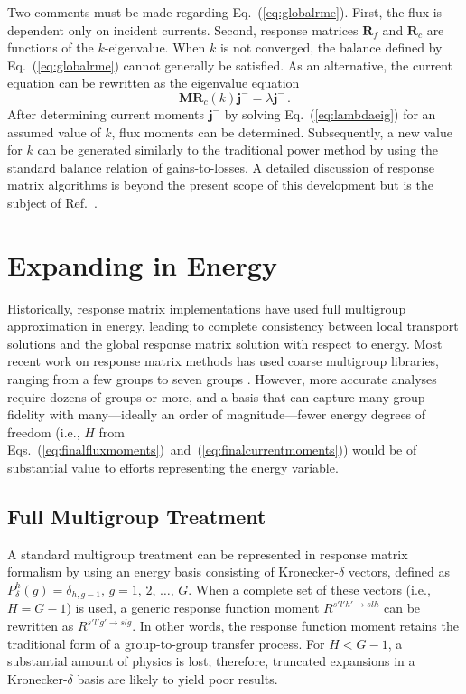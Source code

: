 \documentclass[5p,times,twocolumn,10pt]{elsarticle}
\newcommand{\EQ}[1]{Eq.~(\ref{#1})}               %
\newcommand{\EQSTWO}[2]{Eqs.~(\ref{#1})~and~(\ref{#2})}            %
\begin{document}
  Two comments must be made regarding 
  \EQ{eq:globalrme}.  First, the flux is dependent only 
  on incident currents. Second, response 
  matrices $\mathbf{R}_{f}$ and $\mathbf{R}_{c}$ are 
  functions of the $k$-eigenvalue.  When $k$ is not converged,
  the balance defined by \EQ{eq:globalrme} cannot generally be satisfied.
  As an alternative,
  the current equation can be rewritten as the 
  eigenvalue equation
  \begin{equation}
    \mathbf{MR}_{c}(k)   \mathbf{j}^- = \lambda \mathbf{j}^- \, .
    \label{eq:lambdaeig}
  \end{equation}
  After determining current moments $\mathbf{j}^-$ 
  by solving \EQ{eq:lambdaeig} for an assumed value of $k$, 
  flux moments can be determined.  
  Subsequently, a new value 
  for $k$ can be generated similarly to the traditional 
  power method by using the standard 
  balance relation of gains-to-losses.
  A detailed discussion of 
  response matrix algorithms is beyond the present scope of this development but 
  is the subject of Ref.~. 
  
  \section{Expanding in Energy}
  
  Historically, response matrix implementations have used full multigroup
  approximation in energy, leading to complete consistency between local transport solutions and the global
  response matrix solution with respect to energy. Most recent work on response matrix methods has used 
  coarse multigroup libraries, ranging from a few groups \cite{ishii2009tdd} to seven groups \cite{forget2006tdh}.
  However, more accurate analyses require dozens of groups or more, and a basis that can capture many-group fidelity
  with many---ideally an order of magnitude---fewer energy degrees of freedom (i.e., $H$ from
  \EQSTWO{eq:finalfluxmoments}{eq:finalcurrentmoments}) would be of substantial value to efforts representing
  the energy variable.  
  
  \subsection{Full Multigroup Treatment}
  
  A standard multigroup treatment can be represented in
  response matrix formalism by using an energy basis consisting 
  of Kronecker-$\delta$ vectors, defined as
  $P_{\delta}^h(g) = \delta_{h, g-1},\, g=1,\, 2,\, \ldots,\, G$.
  When a complete set  of 
  these vectors (i.e., $H = G-1$) is used, 
  a generic response function moment $R^{s'l'h' \to slh}$ can 
  be rewritten as $R^{s'l'g' \to slg}$.  In other words, 
  the response function moment retains the traditional 
  form of a group-to-group transfer process.  For $H < G-1$, 
  a substantial amount of physics is lost; therefore, truncated
  expansions in a Kronecker-$\delta$ basis are likely to 
  yield poor results.
  
\end{document}
